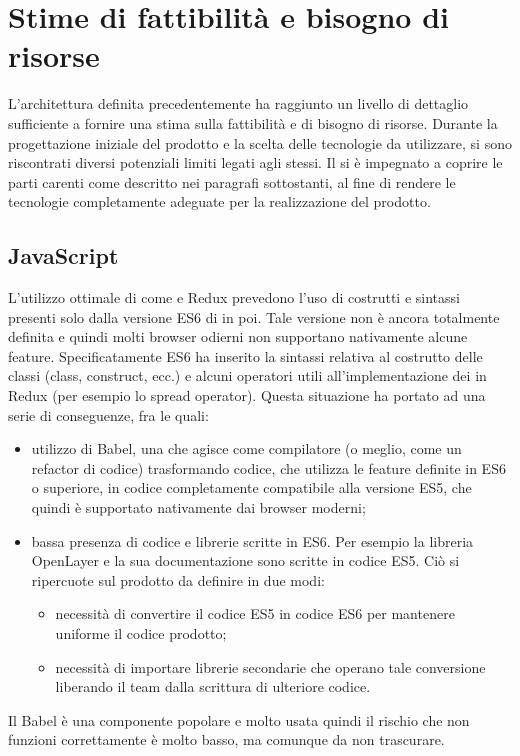 \newpage

\section{Stime di fattibilità e bisogno di risorse}
\label{sec:sdf}

L'architettura definita precedentemente ha raggiunto un livello di dettaglio sufficiente a fornire una stima sulla fattibilità e di bisogno di risorse.
Durante la progettazione iniziale del prodotto e la scelta delle tecnologie da utilizzare, si sono riscontrati diversi potenziali limiti legati agli stessi.
Il  si è impegnato a coprire le parti carenti come descritto nei paragrafi sottostanti, al fine di rendere le tecnologie completamente adeguate per la realizzazione del prodotto.

\subsection{JavaScript}

L'utilizzo ottimale di  come  e Redux prevedono l'uso di costrutti e sintassi presenti solo dalla versione ES6 di  in poi. Tale versione non è ancora totalmente definita e quindi molti browser odierni non supportano nativamente alcune feature. Specificatamente ES6 ha inserito la sintassi relativa al costrutto delle classi (class, construct, ecc.) e alcuni operatori utili all'implementazione dei  in Redux (per esempio lo spread operator). Questa situazione ha portato ad una serie di conseguenze, fra le quali:
\begin{itemize}
	\item utilizzo di Babel, una  \js{} che agisce come compilatore (o meglio, come un refactor di codice) trasformando codice, che utilizza le feature definite in ES6 o superiore, in codice completamente compatibile alla versione ES5, che quindi è supportato nativamente dai browser moderni;
	\item bassa presenza di codice e librerie scritte in ES6. Per esempio la libreria OpenLayer e la sua documentazione sono scritte in codice ES5. Ciò si ripercuote sul prodotto da definire in due modi:
	\begin{itemize}
		\item necessità di convertire il codice ES5 in codice ES6 per mantenere uniforme il codice prodotto;
		\item necessità di importare librerie secondarie che operano tale conversione liberando il team dalla scrittura di ulteriore codice.
	\end{itemize}
\end{itemize}
Il  Babel è una componente popolare e molto usata quindi il rischio che  non funzioni correttamente è molto basso, ma comunque da non trascurare.

